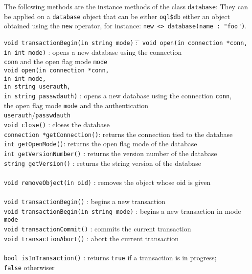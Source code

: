 The following methods are the instance methods of the class \texttt{database}:
They can be applied on a \texttt{database} object that can be either
\texttt{oql\$db} either an object obtained using the \texttt{new} operator,
for instance: \texttt{new <> database(name : "foo")}.
\begin{tabbing}
\texttt{void trans}\=\texttt{actionBegin(in string mode)} \= : \= \kill
\texttt{void open(}\>\texttt{in connection *conn,}\\
                   \>\texttt{in int mode)}\> : opens a new database using the connection\\
                   \>\>\>\texttt{conn} and the open flag mode \texttt{mode}\\
\texttt{void open(}\>\texttt{in connection *conn,}\\
                   \>\texttt{in int mode,} \\
                   \>\texttt{in string userauth,}\\
                   \>\texttt{in string passwdauth)}\> :  opens a new database using the connection \texttt{conn},\\
                       \>\>\> the open flag mode \texttt{mode} and the authentication\\
                        \>\>\> \texttt{userauth}/\texttt{passwdauth}\\
\texttt{void close()}\>\> : closes the database\\
\texttt{connection *getConnection()}\>\>: returns the connection tied to
the database\\
\texttt{int getOpenMode()}\>\>: returns the open flag mode of the database
 \\
\texttt{int getVersionNumber()}\>\> : returns the version number of the database\\
\texttt{string getVersion()}\>\> : returns the string version of the database\\
 \\
\texttt{void removeObject(in oid)}\>\> : removes the object whose oid is given\\
 \\
\texttt{void transactionBegin()}\>\> : begins a new transaction\\
\texttt{void transactionBegin(in string mode)}\>\> : begins a new transaction
in mode \texttt{mode}\\
\texttt{void transactionCommit()}\>\> : commits the current transaction\\
\texttt{void transactionAbort()}\>\> : abort the current transaction\\
  \\
\texttt{bool isInTransaction()}\>\> : returns \texttt{true} if
a transaction is in progress;\\
\>\>\> \texttt{false} otherwiser\\
 \\
\end{tabbing}

